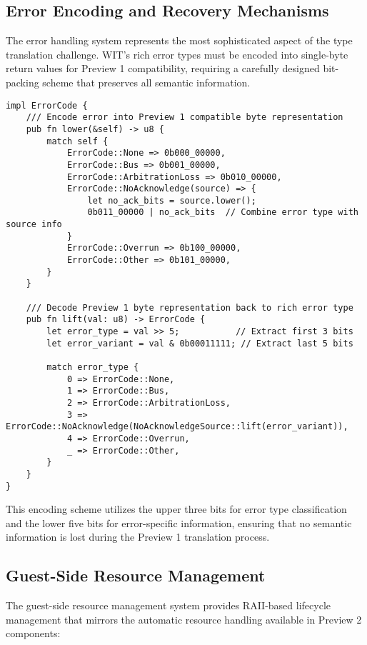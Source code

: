 \subsection{Error Encoding and Recovery Mechanisms}

The error handling system represents the most sophisticated aspect of the type translation challenge. WIT's rich error types must be encoded into single-byte return values for Preview 1 compatibility, requiring a carefully designed bit-packing scheme that preserves all semantic information.

\begin{verbatim}
impl ErrorCode {
    /// Encode error into Preview 1 compatible byte representation
    pub fn lower(&self) -> u8 {
        match self {
            ErrorCode::None => 0b000_00000,
            ErrorCode::Bus => 0b001_00000,
            ErrorCode::ArbitrationLoss => 0b010_00000,
            ErrorCode::NoAcknowledge(source) => {
                let no_ack_bits = source.lower();
                0b011_00000 | no_ack_bits  // Combine error type with source info
            }
            ErrorCode::Overrun => 0b100_00000,
            ErrorCode::Other => 0b101_00000,
        }
    }

    /// Decode Preview 1 byte representation back to rich error type
    pub fn lift(val: u8) -> ErrorCode {
        let error_type = val >> 5;           // Extract first 3 bits
        let error_variant = val & 0b00011111; // Extract last 5 bits
        
        match error_type {
            0 => ErrorCode::None,
            1 => ErrorCode::Bus,
            2 => ErrorCode::ArbitrationLoss,
            3 => ErrorCode::NoAcknowledge(NoAcknowledgeSource::lift(error_variant)),
            4 => ErrorCode::Overrun,
            _ => ErrorCode::Other,
        }
    }
}
\end{verbatim}

This encoding scheme utilizes the upper three bits for error type classification and the lower five bits for error-specific information, ensuring that no semantic information is lost during the Preview 1 translation process.

\subsection{Guest-Side Resource Management}

The guest-side resource management system provides RAII-based lifecycle management that mirrors the automatic resource handling available in Preview 2 components:

